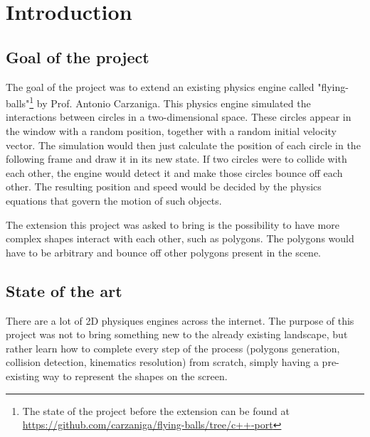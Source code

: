 \section{Introduction}
\subsection{Goal of the project}
The goal of the project was to extend an existing physics engine called
"flying-balls"\footnote{The state of the project before the extension can be
	found at \url{https://github.com/carzaniga/flying-balls/tree/c++-port}} by Prof. Antonio
Carzaniga. This physics engine simulated the interactions between circles in a
two-dimensional space. These circles appear in the window with a random
position, together with a random initial velocity vector. The simulation would
then just calculate the position of each circle in the following frame and draw
it in its new state. If two circles were to collide with each other, the engine
would detect it and make those circles bounce off each other. The resulting
position and speed would be decided by the physics equations that govern the
motion of such objects.

The extension this project was asked to bring is the possibility to have more
complex shapes interact with each other, such as polygons. The polygons would
have to be arbitrary and bounce off other polygons present in the scene.

\subsection{State of the art}

There are a lot of 2D physiques engines across the internet. The purpose of this
project was not to bring something new to the already existing landscape, but
rather learn how to complete every step of the process (polygons generation,
collision detection, kinematics resolution) from scratch, simply having a
pre-existing way to represent the shapes on the screen.
